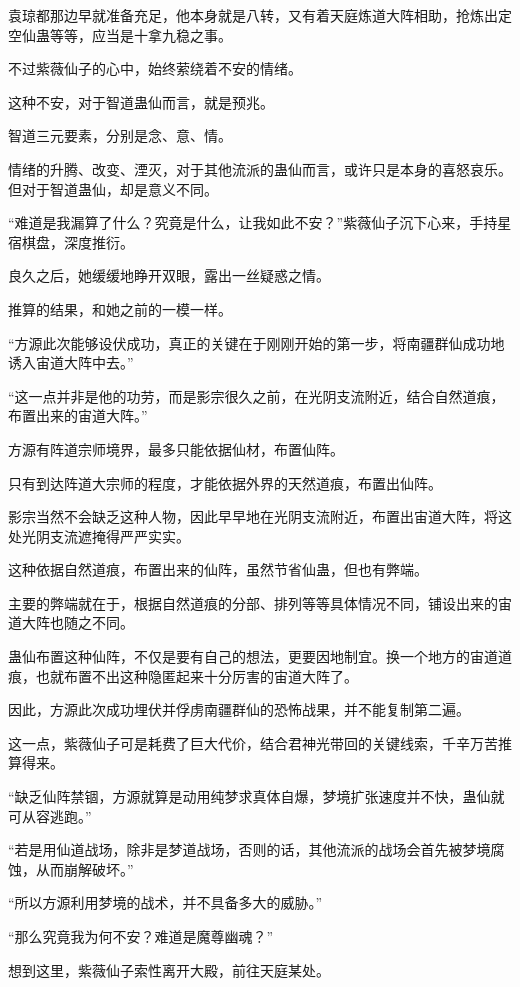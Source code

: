 \begin{this_body}
袁琼都那边早就准备充足，他本身就是八转，又有着天庭炼道大阵相助，抢炼出定空仙蛊等等，应当是十拿九稳之事。

不过紫薇仙子的心中，始终萦绕着不安的情绪。

这种不安，对于智道蛊仙而言，就是预兆。

智道三元要素，分别是念、意、情。

情绪的升腾、改变、湮灭，对于其他流派的蛊仙而言，或许只是本身的喜怒哀乐。但对于智道蛊仙，却是意义不同。

“难道是我漏算了什么？究竟是什么，让我如此不安？”紫薇仙子沉下心来，手持星宿棋盘，深度推衍。

良久之后，她缓缓地睁开双眼，露出一丝疑惑之情。

推算的结果，和她之前的一模一样。

“方源此次能够设伏成功，真正的关键在于刚刚开始的第一步，将南疆群仙成功地诱入宙道大阵中去。”

“这一点并非是他的功劳，而是影宗很久之前，在光阴支流附近，结合自然道痕，布置出来的宙道大阵。”

方源有阵道宗师境界，最多只能依据仙材，布置仙阵。

只有到达阵道大宗师的程度，才能依据外界的天然道痕，布置出仙阵。

影宗当然不会缺乏这种人物，因此早早地在光阴支流附近，布置出宙道大阵，将这处光阴支流遮掩得严严实实。

这种依据自然道痕，布置出来的仙阵，虽然节省仙蛊，但也有弊端。

主要的弊端就在于，根据自然道痕的分部、排列等等具体情况不同，铺设出来的宙道大阵也随之不同。

蛊仙布置这种仙阵，不仅是要有自己的想法，更要因地制宜。换一个地方的宙道道痕，也就布置不出这种隐匿起来十分厉害的宙道大阵了。

因此，方源此次成功埋伏并俘虏南疆群仙的恐怖战果，并不能复制第二遍。

这一点，紫薇仙子可是耗费了巨大代价，结合君神光带回的关键线索，千辛万苦推算得来。

“缺乏仙阵禁锢，方源就算是动用纯梦求真体自爆，梦境扩张速度并不快，蛊仙就可从容逃跑。”

“若是用仙道战场，除非是梦道战场，否则的话，其他流派的战场会首先被梦境腐蚀，从而崩解破坏。”

“所以方源利用梦境的战术，并不具备多大的威胁。”

“那么究竟我为何不安？难道是魔尊幽魂？”

想到这里，紫薇仙子索性离开大殿，前往天庭某处。


\end{this_body}
